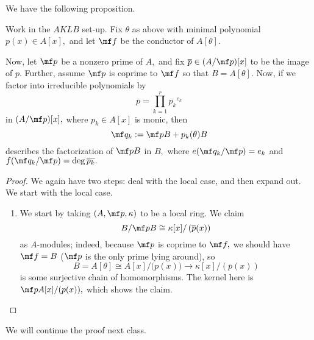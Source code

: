 \documentclass[../notes.tex]{subfiles}
\begin{document}
We have the following proposition.
\begin{proposition}
	Work in the $AKLB$ set-up. Fix $\theta$ as above with minimal polynomial $p(x)\in A[x],$ and let $\mf f$ be the conductor of $A[\theta].$

	Now, let $\mf p$ be a nonzero prime of $A,$ and fix $\overline p\in(A/\mf p)[x]$ to be the image of $p.$ Further, assume $\mf p$ is coprime to $\mf f$ so that $B=A[\theta].$ Now, if we factor into irreducible polynomials by
	\[\overline p=\prod_{k=1}^r\overline{p_k}^{e_k}\]
	in $(A/\mf p)[x],$ where $p_k\in A[x]$ is monic, then
	\[\mf q_k:=\mf pB+p_k(\theta)B\]
	describes the factorization of $\mf pB$ in $B,$ where $e(\mf q_k/\mf p)=e_k$ and $f(\mf q_k/\mf p)=\deg\overline{p_k}.$
\end{proposition}
\begin{proof}
	We again have two steps: deal with the local case, and then expand out. We start with the local case.
	\begin{enumerate}
		\item We start by taking $(A,\mf p,\kappa)$ to be a local ring. We claim
		\[B/\mf pB\cong\kappa[x]/\left(\overline p(x)\right)\]
		as $A$-modules; indeed, because $\mf p$ is coprime to $\mf f,$ we should have $\mf f=B$ ($\mf p$ is the only prime lying around)\todo{}, so
		\[B=A[\theta]\cong A[x]/\big(p(x)\big)\to\kappa[x]/\left(\overline p(x)\right)\]
		is some surjective chain of homomorphisms. The kernel here is $\mf pA[x]/(p(x)),$ which shows the claim.
		\qedhere
	\end{enumerate}
\end{proof}
We will continue the proof next class.
\end{document}
